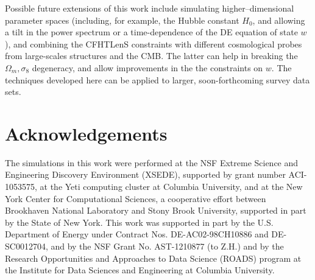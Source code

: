 \documentclass[reprint,aps,prd,superscriptaddress,showkeys,showpacs]{revtex4-1}
\begin{document}
Possible future extensions of this work include simulating
higher--dimensional parameter spaces (including, for example, the
Hubble constant $H_0$, and allowing a tilt in the power spectrum or a
time-dependence of the DE equation of state $w$), and combining the
CFHTLenS constraints with different cosmological probes from
large-scales structures and the CMB. The latter can help in breaking
the $\Omega_m,\sigma_8$ degeneracy, and allow improvements in the the
constraints on $w$.  The techniques developed here can be applied to
larger, soon-forthcoming survey data sets.

 

\section*{Acknowledgements}

The simulations in this work were performed at the NSF Extreme Science
and Engineering Discovery Environment (XSEDE), supported by grant
number ACI-1053575, at the Yeti computing cluster at Columbia
University,
and at the New York Center for Computational Sciences, a cooperative
effort between Brookhaven National Laboratory and Stony Brook
University, supported in part by the State of New York. This work was
supported in part by the U.S. Department of Energy under Contract
Nos. DE-AC02-98CH10886 and DE-SC0012704, and by the NSF Grant
No. AST-1210877 (to Z.H.) and by the Research Opportunities and
Approaches to Data Science (ROADS) program at the Institute for Data
Sciences and Engineering at Columbia University.


\label{lastpage}
\end{document}
